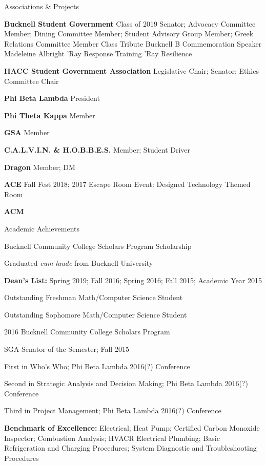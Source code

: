 \documentclass{resume} %
\begin{document}

\begin{rSection}{Associations \& Projects} \itemsep -2pt
\item {\bf Bucknell Student Government} Class of 2019 Senator; Advocacy Committee Member; Dining Committee Member; Student Advisory Group Member; Greek Relations Committee Member
\subitem Class Tribute Bucknell B 
\subitem Commemoration Speaker Madeleine Albright
\subitem 'Ray Response Training
\subitem 'Ray Resilience
\item {\bf HACC Student Government Association} Legislative Chair; Senator; Ethics Committee Chair
\item {\bf Phi Beta Lambda} President
\item {\bf Phi Theta Kappa} Member
\item {\bf GSA} Member
\item {\bf C.A.L.V.I.N. \& H.O.B.B.E.S.} Member; Student Driver
\item {\bf Dragon} Member; DM
\item {\bf ACE} Fall Fest 2018; 2017 Escape Room Event: Designed Technology Themed Room
\item {\bf ACM}


\end{rSection}


\begin{rSection}{Academic Achievements} \itemsep -2pt
\item Bucknell Community College Scholars Program Scholarship
\item Graduated {\it cum laude} from Bucknell University
\item {\bf Dean's List:} Spring 2019; Fall 2016; Spring 2016; Fall 2015; Academic Year 2015
\item Outstanding Freshman Math/Computer Science Student
\item Outstanding Sophomore Math/Computer Science Student
\item 2016 Bucknell Community College Scholars Program
\item SGA Senator of the Semester; Fall 2015
\item First in Who's Who; Phi Beta Lambda 2016(?) Conference
\item Second in Strategic Analysis and Decision Making; Phi Beta Lambda 2016(?) Conference
\item Third in Project Management; Phi Beta Lambda 2016(?) Conference
\item {\bf Benchmark of Excellence:} Electrical; Heat Pump; Certified Carbon Monoxide Inspector; Combustion Analysis; HVACR Electrical Plumbing; Basic Refrigeration and Charging Procedures; System Diagnostic and Troubleshooting Procedures


\end{rSection}
\end{document}
